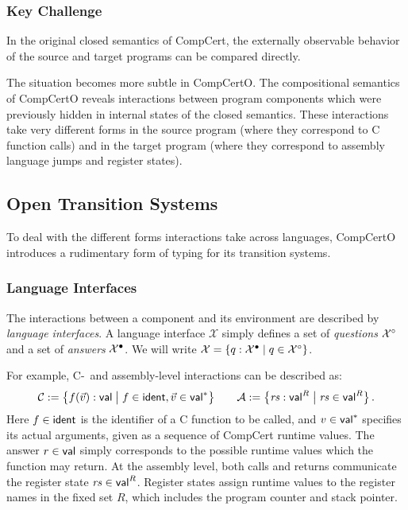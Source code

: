 \documentclass[acmsmall,review,anonymous]{acmart}\settopmatter{printfolios=true,printccs=false,printacmref=false}
\begin{document}

\subsubsection{Key Challenge} %

In the original closed semantics of CompCert,
the externally observable behavior
of the source and target programs
can be compared directly.

The situation becomes more subtle in CompCertO.
The compositional semantics of CompCertO
reveals interactions between program components
which were previously hidden in internal states
of the closed semantics.
These interactions take very different forms
in the source program
(where they correspond to C function calls)
and in the target program
(where they correspond to assembly language jumps
and register states).



\subsection{Open Transition Systems} %

To deal with the different forms
interactions take
across languages,
CompCertO introduces a rudimentary form of typing
for its transition systems.

\subsubsection{Language Interfaces} %

The interactions between a component and its environment
are described by \emph{language interfaces}.
A language interface $\mathcal{X}$ simply defines
a set of \emph{questions} $\mathcal{X}^\circ$ and
a set of \emph{answers} $\mathcal{X}^\bullet$.
We will write
$\mathcal{X} = \{ q : \mathcal{X}^\bullet \mid q \in \mathcal{X}^\circ \}$.

For example, C-~and assembly-level interactions
can be described as:
\[
  \mathcal{C} :=
    \big\{ f(\vec{v}) :  \mathsf{val}  \mathrel{\big|}
       f \in  \mathsf{ident} , \vec{v} \in  \mathsf{val} ^* \big\}
  \qquad
  \mathcal{A} :=
    \big\{ \mathit{rs} :  \mathsf{val} ^R \mathrel{\big|}
       \mathit{rs} \in  \mathsf{val} ^R \big\}
  \,.
\]
Here $f \in  \mathsf{ident} $ is the identifier of
a C function to be called,
and $v \in  \mathsf{val} ^*$ specifies its actual arguments,
given as a sequence of CompCert runtime values.
The answer $r \in  \mathsf{val} $ simply corresponds to
the possible runtime values which the function may return.
At the assembly level,
both calls and returns communicate
the register state $\mathit{rs} \in  \mathsf{val} ^R$.
Register states assign runtime values
to the register names in the fixed set $R$,
which includes the program counter and stack pointer.
\end{document}
